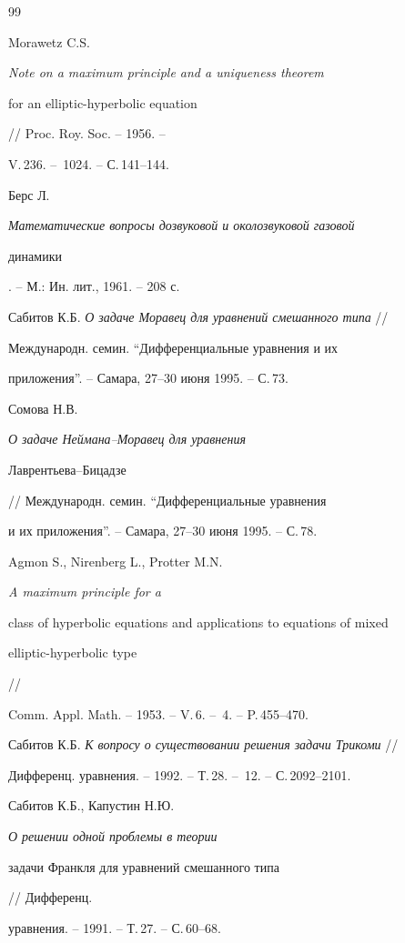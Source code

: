 \begin{thebibliography}{99} 


 




Morawetz C.S. {\em Note on a maximum principle and a uniqueness theorem 


for an elliptic-hyperbolic equation} // Proc. Roy. Soc. -- 1956. -- 


V.\,236. -- \No\,1024. -- С.\,141--144. 




Берс Л. {\em Математические вопросы дозвуковой и околозвуковой газовой 


динамики}. -- М.: Ин. лит., 1961. -- 208 с. 




Сабитов К.Б. {\em О задаче Моравец для уравнений смешанного типа} // 


Международн. семин. ``Дифференциальные уравнения и их 


приложения''. -- Самара, 27--30 июня 1995. -- С.\,73. 




Сомова Н.В. {\em О задаче Неймана--Моравец для уравнения 


Лаврентьева--Бицадзе} // Международн. семин. ``Дифференциальные уравнения 


и их приложения''. -- Самара, 27--30 июня 1995. -- С.\,78. 




Agmon S., Nirenberg L., Protter M.N. {\em A maximum principle for a 


class of hyperbolic equations and applications to equations of mixed 


elliptic-hyperbolic type} // 


Comm. Appl. Math. -- 1953. -- V.\,6. -- \No\,4. -- P.\,455--470. 




Сабитов К.Б. {\em К вопросу о существовании решения задачи Трикоми} // 


Дифференц. уравнения. -- 1992. -- Т.\,28. -- \No\,12. -- С.\,2092--2101. 




Сабитов К.Б., Капустин Н.Ю. {\em О решении одной проблемы в теории 


задачи Франкля для уравнений смешанного типа} // Дифференц. 


уравнения. -- 1991. -- Т.\,27. -- С.\,60--68. 



\end{thebibliography}
